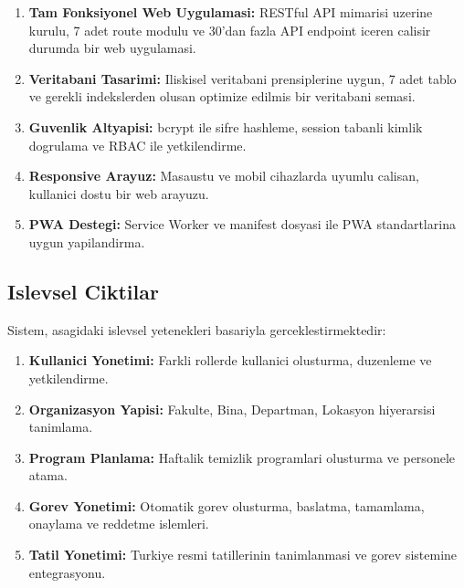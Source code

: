 \begin{enumerate}
    \item \textbf{Tam Fonksiyonel Web Uygulamasi:} RESTful API 
    mimarisi uzerine kurulu, 7 adet route modulu ve 30'dan fazla 
    API endpoint iceren calisir durumda bir web uygulamasi.
    
    \item \textbf{Veritabani Tasarimi:} Iliskisel veritabani 
    prensiplerine uygun, 7 adet tablo ve gerekli indekslerden 
    olusan optimize edilmis bir veritabani semasi.
    
    \item \textbf{Guvenlik Altyapisi:} bcrypt ile sifre hashleme, 
    session tabanli kimlik dogrulama ve RBAC ile yetkilendirme.
    
    \item \textbf{Responsive Arayuz:} Masaustu ve mobil cihazlarda 
    uyumlu calisan, kullanici dostu bir web arayuzu.
    
    \item \textbf{PWA Destegi:} Service Worker ve manifest dosyasi 
    ile PWA standartlarina uygun yapilandirma.
\end{enumerate}

\subsection{Islevsel Ciktilar}
\label{subsec:islevsel-ciktilar}

Sistem, asagidaki islevsel yetenekleri basariyla gerceklestirmektedir:

\begin{enumerate}
    \item \textbf{Kullanici Yonetimi:} Farkli rollerde kullanici 
    olusturma, duzenleme ve yetkilendirme.
    
    \item \textbf{Organizasyon Yapisi:} Fakulte, Bina, Departman, 
    Lokasyon hiyerarsisi tanimlama.
    
    \item \textbf{Program Planlama:} Haftalik temizlik programlari 
    olusturma ve personele atama.
    
    \item \textbf{Gorev Yonetimi:} Otomatik gorev olusturma, baslatma, 
    tamamlama, onaylama ve reddetme islemleri.
    
    \item \textbf{Tatil Yonetimi:} Turkiye resmi tatillerinin 
    tanimlanmasi ve gorev sistemine entegrasyonu.
\end{enumerate}

